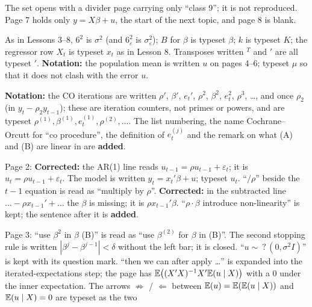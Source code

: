 \documentclass[11pt]{article}
\begin{document}
\begin{transcriptnotes}
  \item The set opens with a divider page carrying only ``class 9''; it is not
        reproduced. Page 7 holds only $y = X\beta + u$, the start of the next topic,
        and page 8 is blank.
  \item As in Lessons 3--8, $6^{2}$ is $\sigma^{2}$ (and $6_{\varepsilon}^{2}$ is
        $\sigma_{\varepsilon}^{2}$); $B$ for $\beta$ is typeset $\beta$; $k$ is
        typeset $K$; the regressor row $X_{t}$ is typeset $x_{t}$ as in Lesson 8.
        Transposes written ${}^{T}$ and ${}'$ are all typeset ${}'$.
        \textbf{Notation:} the population mean is written $u$ on pages 4--6; typeset
        $\mu$ so that it does not clash with the error $u$.
  \item \textbf{Notation:} the CO iterations are written $\rho'$, $\beta'$, $e_{t}'$,
        $\rho^{2}$, $\beta^{2}$, $e_{t}^{2}$, $\rho^{3}$, \ldots, and once
        $\rho_{2}$ (in $y_{t} - \rho_{2}y_{t-1}$); these are iteration counters, not
        primes or powers, and are typeset $\rho^{(1)}, \beta^{(1)}, e_{t}^{(1)},
        \rho^{(2)}, \ldots$. The list numbering, the name Cochrane--Orcutt for
        ``co procedure'', the definition of $e_{t}^{(j)}$ and the remark on what (A)
        and (B) are linear in are \textbf{added}.
  \item Page 2: \textbf{Corrected:} the AR(1) line reads
        $u_{t-1} = \rho u_{t-1} + \varepsilon_{t}$; it is $u_{t} = \rho u_{t-1} +
        \varepsilon_{t}$. The model is written $y_{t} = x_{t}'\beta + u$; typeset
        $u_{t}$. ``$/\rho$'' beside the $t-1$ equation is read as ``multiply by
        $\rho$''. \textbf{Corrected:} in the subtracted line
        $\ldots - \rho x_{t-1}' + \ldots$ the $\beta$ is missing; it is
        $\rho x_{t-1}'\beta$. ``$\rho\cdot\beta$ introduce non-linearity'' is kept;
        the sentence after it is \textbf{added}.
  \item Page 3: ``use $\beta^{2}$ in $\beta$ (B)'' is read as ``use $\beta^{(2)}$
        for $\beta$ in (B)''. The second stopping rule is written
        $|\beta^{j} - \beta^{j-1}| < \delta$ without the left bar; it is closed.
        ``$u \sim\ ?\,(0, \sigma^{2}I)$'' is kept with its question mark. ``then we
        can after apply \ldots'' is expanded into the iterated-expectations step;
        the page has $\mathbb{E}\bigl((X'X)^{-1}X'\mathbb{E}(u\mid X)\bigr)$ with a $0$ under the
        inner expectation. The arrows $\not\Rightarrow$ / $\Leftarrow$ between
        $\mathbb{E}(u) = \mathbb{E}(\mathbb{E}(u\mid X))$ and $\mathbb{E}(u\mid X) = 0$ are typeset as the two

\end{transcriptnotes}
\end{document}
